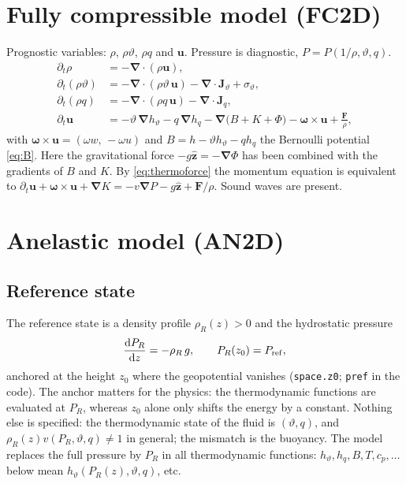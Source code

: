\documentclass[11pt,a4paper]{article}
\newcommand{\vt}{\vartheta}                    %
\newcommand{\hth}{{h_{\vartheta}}}               %
\newcommand{\hq}{{h_q}}                          %
\newcommand{\bu}{\mathbf{u}}
\newcommand{\ez}{\hat{\mathbf{z}}}
\newcommand{\bJ}{\mathbf{J}}
\newcommand{\bF}{\mathbf{F}}
\newcommand{\bnabla}{\boldsymbol{\nabla}}
\newcommand{\bomega}{\boldsymbol{\omega}}
\newcommand{\code}[1]{\texttt{#1}}
\begin{document}
\section{Fully compressible model (FC2D)}\label{sec:fc}
Prognostic variables: $\rho$, $\rho\vt$, $\rho q$ and $\bu$. Pressure is diagnostic, $P=P(1/\rho,\vt,q)$.
\begin{subequations}\label{eq:fc}
\begin{align}
  \partial_t\rho &= -\bnabla\!\cdot(\rho\bu),\\
  \partial_t(\rho\vt) &= -\bnabla\!\cdot(\rho\vt\,\bu) - \bnabla\!\cdot\bJ_\vt + \sigma_\vt,\\
  \partial_t(\rho q) &= -\bnabla\!\cdot(\rho q\,\bu) - \bnabla\!\cdot\bJ_q,\\
  \partial_t\bu &= -\vt\,\bnabla\hth - q\,\bnabla\hq - \bnabla\big(B+K+\Phi\big) - \bomega\times\bu + \frac{\bF}{\rho},
  \label{eq:fc-mom}
\end{align}
\end{subequations}
with $\bomega\times\bu=(\omega w,\,-\omega u)$ and $B=h-\vt\hth-q\hq$ the Bernoulli potential \eqref{eq:B}. Here the gravitational force $-g\ez=-\bnabla\Phi$ has been combined with the gradients of $B$ and $K$. By \eqref{eq:thermoforce} the momentum equation is equivalent to
$\partial_t\bu+\bomega\times\bu+\bnabla K=-v\bnabla P-g\ez+\bF/\rho$. Sound waves are present.

\section{Anelastic model (AN2D)}\label{sec:an}
\subsection{Reference state}
The reference state is a density profile $\rho_R(z)>0$ and the hydrostatic pressure
\begin{equation}
  \frac{\mathrm{d}P_R}{\mathrm{d}z}=-\rho_R\,g,\qquad P_R(z_0)=P_{\rm ref},
\end{equation}
anchored at the height $z_0$ where the geopotential vanishes (\code{space.z0}; \code{pref} in the code). The anchor matters for the physics: the thermodynamic functions are evaluated at $P_R$, whereas $z_0$ alone only shifts the energy by a constant.
Nothing else is specified: the thermodynamic state of the fluid is $(\vt,q)$, and $\rho_R(z)v(P_R,\vt,q)\neq1$ in general; the
mismatch is the buoyancy. The model replaces the full pressure by $P_R$ in all thermodynamic functions:
$\hth,\hq,B,T,c_p,\ldots$ below mean $\hth(P_R(z),\vt,q)$, etc.
\end{document}
